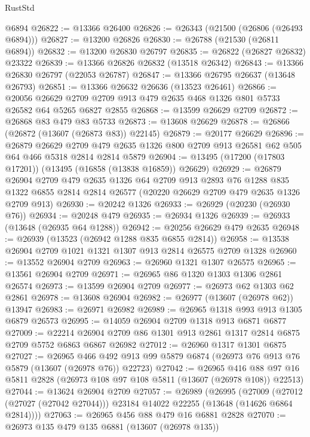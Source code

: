\begin{lexlean}{RustStd}
\begin{coremodule}
    @6894
@26822 := @13366 @26400
@26826 := @26343 (@21500 (@26806 (@26493 @6894)))
@26827 := @13200 @26826
@26830 := @26788 (@21530 (@26811 @6894))
@26832 := @13200 @26830 @26797
@26835 := @26822 (@26827 @26832) @23322
@26839 := @13366 @26826 @26832 (@13518 @26342)
@26843 := @13366 @26830 @26797 (@22053 @26787)
@26847 := @13366 @26795 @26637 (@13648 @26793)
@26851 := @13366 @26632 @26636 (@13523 @26461)
@26866 := @20056
    @26629
    @2709
    @2709
    @913
    @479
    @2635
    @468
    @1326
    @801
    @5733
    @26582
    @64
    @5265
    @6827
    @2855
@26868 := @13599 @26629 @2709
@26872 := @26868 @83 @479 @83 @5733
@26873 := @13608 @26629
@26878 := @26866 (@26872 (@13607 (@26873 @83)) @22145)
@26879 := @20177 @26629
@26896 := @26879
    @26629
    @2709
    @479
    @2635
    @1326
    @800
    @2709
    @913
    @26581
    @62
    @505
    @64
    @466
    @5318
    @2814
    @2814
    @5879
@26904 := @13495 (@17200 (@17803 @17201)) (@13495 (@16858 (@13838 @16859)) @26629)
@26929 := @26879
    @26904
    @2709
    @479
    @2635
    @1326
    @64
    @2709
    @913
    @2893
    @76
    @1288
    @835
    @1322
    @6855
    @2814
    @2814
    @26577
    (@20220 @26629 @2709 @479 @2635 @1326 @2709 @913)
@26930 := @20242 @1326
@26933 := @26929 (@20230 (@26930 @76))
@26934 := @20248 @479
@26935 := @26934 @1326
@26939 := @26933 (@13648 (@26935 @64 @1288))
@26942 := @20256 @26629 @479 @2635
@26948 := @26939 (@13523 (@26942 @1288 @835 @6855 @2814))
@26958 := @13538 @26904 @2709 @1021 @1321 @1307 @913 @2814 @26575 @2709 @1328
@26960 := @13552 @26904 @2709
@26963 := @26960 @1321 @1307 @26575
@26965 := @13561 @26904 @2709
@26971 := @26965 @86 @1320 @1303 @1306 @2861 @26574
@26973 := @13599 @26904 @2709
@26977 := @26973 @62 @1303 @62 @2861
@26978 := @13608 @26904
@26982 := @26977 (@13607 (@26978 @62)) @13947
@26983 := @26971 @26982
@26989 := @26965 @1318 @993 @913 @1305 @6879 @26573
@26995 := @14059 @26904 @2709 @1318 @913 @6871 @6877
@27009 := @22214 @26904 @2709 @86 @1301 @913 @2861 @1317 @2814 @6875 @2709 @5752 @6863 @6867 @26982
@27012 := @26960 @1317 @1301 @6875
@27027 := @26965
    @466
    @492
    @913
    @99
    @5879
    @6874
    (@26973 @76 @913 @76 @5879 (@13607 (@26978 @76)) @22723)
@27042 := @26965
    @416
    @88
    @97
    @16
    @5811
    @2828
    (@26973 @108 @97 @108 @5811 (@13607 (@26978 @108)) @22513)
@27044 := @13624 @26904 @2709
@27057 := @26989
    (@26995
      (@27009 (@27012 (@27027 (@27042 @27044))) @23184 @14022 @22255 (@13648 (@14626 @6864 @2814))))
@27063 := @26965 @456 @88 @479 @16 @6881 @2828
@27070 := @26973 @135 @479 @135 @6881 (@13607 (@26978 @135))

\end{coremodule}
\end{lexlean}
